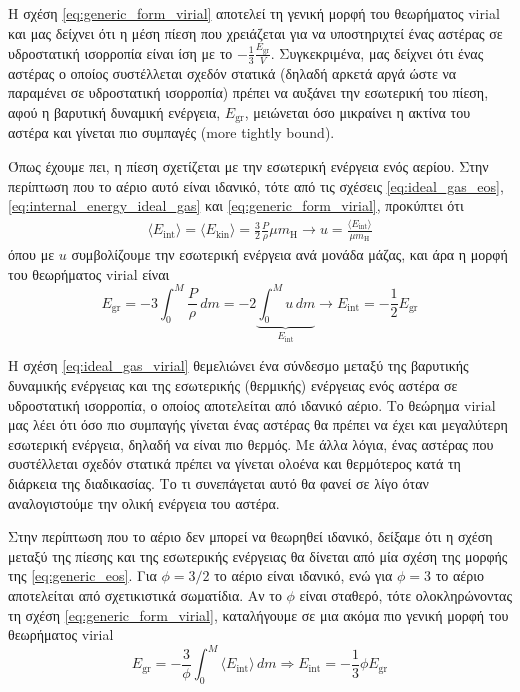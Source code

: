 Η σχέση \eqref{eq:generic_form_virial} αποτελεί τη γενική μορφή του θεωρήματος virial και μας δείχνει ότι η μέση πίεση που χρειάζεται για να υποστηριχτεί ένας αστέρας σε υδροστατική ισορροπία είναι ίση με το $- \frac{1}{3} \frac{E_{\text{gr}}}{V}$. Συγκεκριμένα, μας δείχνει ότι ένας αστέρας ο οποίος συστέλλεται σχεδόν στατικά (δηλαδή αρκετά αργά ώστε να παραμένει σε υδροστατική ισορροπία) πρέπει να αυξάνει την εσωτερική του πίεση, αφού η βαρυτική δυναμική ενέργεια, $E_{\text{gr}}$, μειώνεται όσο μικραίνει η ακτίνα του αστέρα και γίνεται πιο συμπαγές (more tightly bound).


Όπως έχουμε πει, η πίεση σχετίζεται με την εσωτερική ενέργεια ενός αερίου. Στην περίπτωση που το αέριο αυτό είναι ιδανικό, τότε από τις σχέσεις \eqref{eq:ideal_gas_eos}, \eqref{eq:internal_energy_ideal_gas} και \eqref{eq:generic_form_virial}, προκύπτει ότι 
\begin{align*}
    \langle E_{\text{int}} \rangle = \langle E_{\text{kin}} \rangle = \frac{3}{2} \frac{P}{\rho} \mu m_{\text{H}} \longrightarrow u = \frac{\langle E_{\text{int}} \rangle}{\mu m_{\text{H}}}
\end{align*}
όπου με $u$ συμβολίζουμε την εσωτερική ενέργεια ανά μονάδα μάζας, και άρα η μορφή του θεωρήματος virial είναι
\begin{equation}
    \label{eq:ideal_gas_virial}
    E_{\text{gr}} = -3 \int_{0}^{M} \frac{P}{\rho} \,dm = - 2 \underbrace{\int_{0}^{M} u \,dm}_{E_{\text{int}}} \rightarrow \boxed{E_{\text{int}} = - \frac{1}{2} E_{\text{gr}}}
\end{equation}
 
Η σχέση \eqref{eq:ideal_gas_virial} θεμελιώνει ένα σύνδεσμο μεταξύ της βαρυτικής δυναμικής ενέργειας και της εσωτερικής (θερμικής) ενέργειας ενός αστέρα σε υδροστατική ισορροπία, ο οποίος αποτελείται από ιδανικό αέριο. Το θεώρημα virial μας λέει ότι όσο πιο συμπαγής γίνεται ένας αστέρας θα πρέπει να έχει και μεγαλύτερη εσωτερική ενέργεια, δηλαδή να είναι πιο θερμός. Με άλλα λόγια, ένας αστέρας που συστέλλεται σχεδόν στατικά πρέπει να γίνεται ολοένα και θερμότερος κατά τη διάρκεια της διαδικασίας. Το τι συνεπάγεται αυτό θα φανεί σε λίγο όταν αναλογιστούμε την ολική ενέργεια του αστέρα.

Στην περίπτωση που το αέριο δεν μπορεί να θεωρηθεί ιδανικό, δείξαμε ότι η σχέση μεταξύ της πίεσης και της εσωτερικής ενέργειας θα δίνεται από μία σχέση της μορφής της \eqref{eq:generic_eos}. Για $\phi = 3/2$ το αέριο είναι ιδανικό, ενώ για $\phi = 3$ το αέριο αποτελείται από σχετικιστικά σωματίδια. Αν το $\phi$ είναι σταθερό, τότε ολοκληρώνοντας τη σχέση \eqref{eq:generic_form_virial}, καταλήγουμε σε μια ακόμα πιο γενική μορφή του θεωρήματος virial
\begin{equation}
    \label{eq:generic_eos_virial}
    E_{\text{gr}} = - \frac{3}{\phi} \int_{0}^{M} \langle E_{\text{int}} \rangle \,dm \Rightarrow \boxed{ E_{\text{int}} = - \frac{1}{3} \phi  E_{\text{gr}}}
\end{equation}
